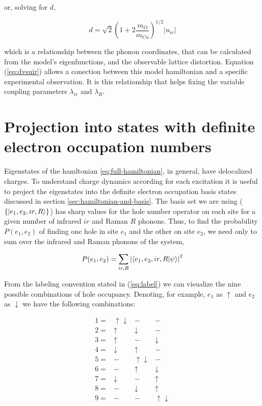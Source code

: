 \noindent or, solving for $d$,

\begin{equation}
  \label{eq:dvsuir}
  d=\sqrt{2}\left(1 + 2\frac{m_O}{m_{Cu}} \right)^{1/2}\left|u_{ir}\right|
\end{equation}

\noindent which is a relationship between the phonon coordinates, that can be calculated from the model's eigenfunctions, and the observable lattice distortion. 
Equation (\ref{eq:dvsuir}) allows a conection between this model hamiltonian and a specific experimental observation. 
It is this relationship that helps fixing the variable coupling parameters $\lambda_{ir}$ and $\lambda_R$.

\section{Projection into states with definite electron occupation numbers}
\label{sec:electronic-projection}

Eigenstates of the hamltonian \ref{eq:full-hamiltonian}, in general, have delocalized charges.
To understand charge dynamics according for each excitation it is useful to project the eigenstates into the definite electron occupation basis states discussed in section \ref{sec:hamiltonian-and-basis}.
The basis set we are using ($\{\left | e_1,e_2,ir,R \right\rangle\}$) has sharp values for the hole number operator on each site for a given number of infrared $ir$ and Raman $R$ phonons. 
Thus, to find the probability $P(e_1,e_2)$ of finding one hole in site $e_1$ and the other on site $e_2$, we need only to sum over the infrared and Raman phonons of the system,

\begin{equation}
  \label{eq:electron-occupation}
  P(e_1,e_2)=\sum_{ir,R} \left| \left\langle e_1,e_2,ir,R|\psi\right\rangle \right|^2
\end{equation}

From the labeling convention stated in (\ref{eq:label}) we can visualize the nine possible combinations of hole occupancy. 
Denoting, for example, $e_1$ as $\uparrow$ and $e_2$ as $\downarrow$ we have the following combinations:

\begin{equation}\label{eq:basis-set}
\begin{array}{cccc}
1= & \uparrow \downarrow & - & - \\
2= & \uparrow & \downarrow & - \\
3= & \uparrow & - & \downarrow \\
4= & \downarrow & \uparrow & - \\
5= & - & \uparrow \downarrow & - \\
6= & - & \uparrow & \downarrow \\
7= & \downarrow & - & \uparrow \\
8= & - & \downarrow & \uparrow \\
9= & - & - & \uparrow \downarrow 
\end{array}
\end{equation}

